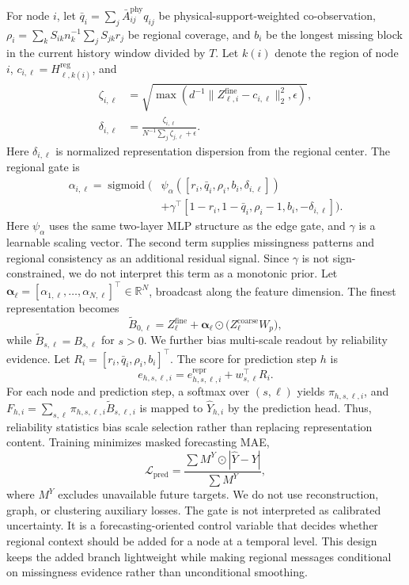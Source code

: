 \documentclass{article}
\newcommand{\phy}{\mathrm{phy}}
\newcommand{\fine}{\mathrm{fine}}
\newcommand{\coarse}{\mathrm{coarse}}
\newcommand{\reg}{\mathrm{reg}}
\newcommand{\sigmoid}{\operatorname{sigmoid}}
\begin{document}
For node $i$, let $\bar q_i=\sum_j\bar A^{\phy}_{ij}q_{ij}$ be physical-support-weighted co-observation, $\rho_i=\sum_kS_{ik}n_k^{-1}\sum_jS_{jk}r_j$ be regional coverage, and $b_i$ be the longest missing block in the current history window divided by $T$. Let $k(i)$ denote the region of node $i$, $c_{i,\ell}=H^{\reg}_{\ell,k(i)}$, and
\begin{align}
\zeta_{i,\ell}&=\sqrt{\max\!\left(d^{-1}\lVert Z^{\fine}_{\ell,i}-c_{i,\ell}\rVert_2^2,\epsilon\right)},\\
\delta_{i,\ell}&=\frac{\zeta_{i,\ell}}{N^{-1}\sum_j\zeta_{j,\ell}+\epsilon}.
\end{align}
Here $\delta_{i,\ell}$ is normalized representation dispersion from the regional center. The regional gate is
\begin{align}
\alpha_{i,\ell}=\sigmoid\big(&\psi_\alpha([r_i,\bar q_i,\rho_i,b_i,\delta_{i,\ell}])\\
&+\gamma^\top[1-r_i,1-\bar q_i,\rho_i-1,b_i,-\delta_{i,\ell}]\big).
\end{align}
Here $\psi_\alpha$ uses the same two-layer MLP structure as the edge gate, and $\gamma$ is a learnable scaling vector. The second term supplies missingness patterns and regional consistency as an additional residual signal. Since $\gamma$ is not sign-constrained, we do not interpret this term as a monotonic prior. Let $\boldsymbol{\alpha}_{\ell}=[\alpha_{1,\ell},\ldots,\alpha_{N,\ell}]^\top\in\mathbb{R}^N$, broadcast along the feature dimension. The finest representation becomes
\begin{equation}
\widetilde B_{0,\ell}=Z^{\fine}_{\ell}+\boldsymbol{\alpha}_{\ell}\odot\big(Z^{\coarse}_{\ell}W_p\big),
\end{equation}
while $\widetilde B_{s,\ell}=B_{s,\ell}$ for $s>0$. We further bias multi-scale readout by reliability evidence. Let $R_i=[r_i,\bar q_i,\rho_i,b_i]^\top$. The score for prediction step $h$ is
\begin{equation}
e_{h,s,\ell,i}=e^{\mathrm{repr}}_{h,s,\ell,i}+w_{s,\ell}^\top R_i.
\end{equation}
For each node and prediction step, a softmax over $(s,\ell)$ yields $\pi_{h,s,\ell,i}$, and $F_{h,i}=\sum_{s,\ell}\pi_{h,s,\ell,i}\widetilde B_{s,\ell,i}$ is mapped to $\hat Y_{h,i}$ by the prediction head. Thus, reliability statistics bias scale selection rather than replacing representation content. Training minimizes masked forecasting MAE,
\begin{equation}
\mathcal{L}_{\mathrm{pred}}=\frac{\sum M^Y\odot|\hat Y-Y|}{\sum M^Y},
\label{eq:pred-loss}
\end{equation}
where $M^Y$ excludes unavailable future targets. We do not use reconstruction, graph, or clustering auxiliary losses.
The gate is not interpreted as calibrated uncertainty. It is a forecasting-oriented control variable that decides whether regional context should be added for a node at a temporal level. This design keeps the added branch lightweight while making regional messages conditional on missingness evidence rather than unconditional smoothing.
\end{document}
